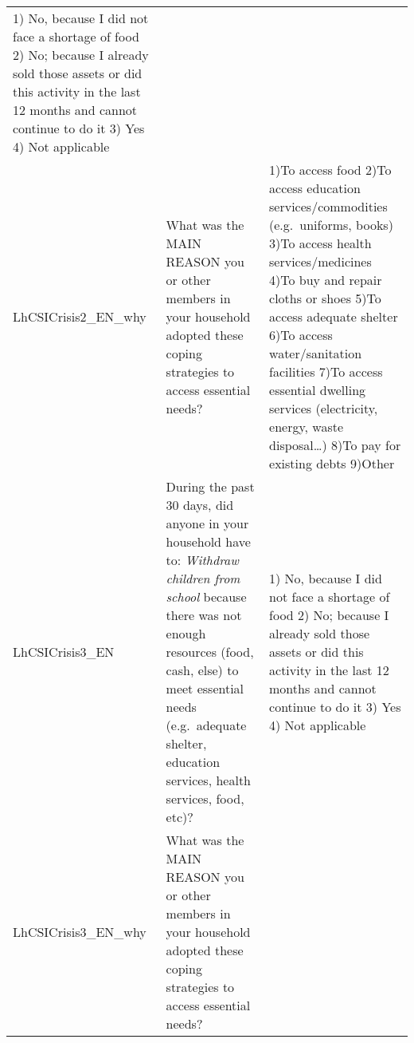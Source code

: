 \documentclass[
]{book}
\begin{document}
\begin{longtable}[]{@{}lll@{}}
\begin{minipage}[t]{0.43\columnwidth}
1) No, because I did not face a shortage of food 2) No; because I already sold those assets or did this activity in the last 12 months and cannot continue to do it 3) Yes 4) Not applicable\strut
\end{minipage}\tabularnewline
\begin{minipage}[t]{0.11\columnwidth}\raggedright
LhCSICrisis2\_EN\_why\strut
\end{minipage} & \begin{minipage}[t]{0.37\columnwidth}\raggedright
What was the MAIN REASON you or other members in your household adopted these coping strategies to access essential needs?\strut
\end{minipage} & \begin{minipage}[t]{0.43\columnwidth}\raggedright
1)To access food 2)To access education services/commodities (e.g.~uniforms, books) 3)To access health services/medicines 4)To buy and repair cloths or shoes 5)To access adequate shelter 6)To access water/sanitation facilities 7)To access essential dwelling services (electricity, energy, waste disposal\ldots) 8)To pay for existing debts 9)Other\strut
\end{minipage}\tabularnewline
\begin{minipage}[t]{0.11\columnwidth}\raggedright
LhCSICrisis3\_EN\strut
\end{minipage} & \begin{minipage}[t]{0.37\columnwidth}\raggedright
During the past 30 days, did anyone in your household have to: \emph{Withdraw children from school} because there was not enough resources (food, cash, else) to meet essential needs (e.g.~adequate shelter, education services, health services, food, etc)?\strut
\end{minipage} & \begin{minipage}[t]{0.43\columnwidth}\raggedright
1) No, because I did not face a shortage of food 2) No; because I already sold those assets or did this activity in the last 12 months and cannot continue to do it 3) Yes 4) Not applicable\strut
\end{minipage}\tabularnewline
\begin{minipage}[t]{0.11\columnwidth}\raggedright
LhCSICrisis3\_EN\_why\strut
\end{minipage} & \begin{minipage}[t]{0.37\columnwidth}\raggedright
What was the MAIN REASON you or other members in your household adopted these coping strategies to access essential needs?\strut
\end{minipage} & \begin{minipage}[t]{0.43\columnwidth}\raggedright

\end{minipage}
\end{longtable}
\end{document}

